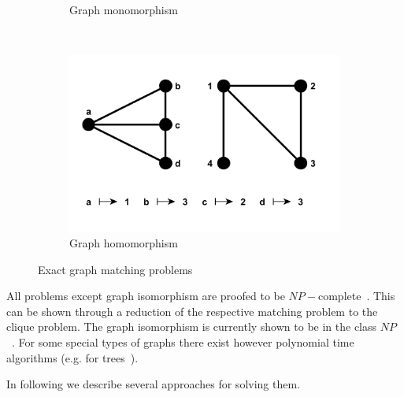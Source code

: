 \begin{figure}[h!]
\begin{subfigure}[b]{0.3\textwidth}
        \caption{Graph monomorphism}
        \label{fig:monomorphism}
    \end{subfigure}
    ~
    \begin{subfigure}[b]{0.3\textwidth}
        \includegraphics[width=\textwidth]{chapter1/fig/homomorphism}
        \caption{Graph homomorphism}
        \label{fig:homomorphism}
    \end{subfigure}
    \caption[Exact graph matching problems]{Exact graph matching problems}\label{fig:Exact_GM}
\end{figure}

All problems except graph isomorphism are proofed to be $NP-$complete~\cite{Garey_NPComplet}. This can be shown through a reduction of the respective matching problem to the clique problem. The graph isomorphism is currently shown to be in the class $NP$~\cite{Garey_NPComplet,Schoening_GI}. For some special types of graphs there exist however polynomial time algorithms (e.g. for %
trees~\cite{Aho_Ullman, Garey_NPComplet}).

 In following we describe several approaches for solving them.
